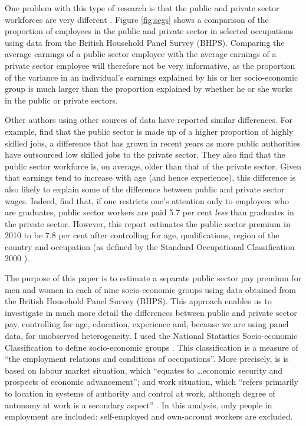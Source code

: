 \documentclass[a4paper,11pt,titlepage]{article}
\begin{document}
 One problem with this type of research is that the public and private sector workforces are very different \citep{IDS2011}.  Figure \ref{fig:segs} shows a comparison of the proportion of employees in the public and private sector in selected occupations using data from the British Household Panel Survey (BHPS).  Comparing the average earnings of a public sector employee with the average earnings of a private sector employee will therefore not be very informative, as the proportion of the variance in an individual's earnings explained by his or her socio-economic group is much larger than the proportion explained by whether he or she works in the public or private sectors.

 Other authors using other sources of data have reported similar differences.  For example, \citet{Damant2011}
 find that the public sector is made up of a higher proportion of highly skilled jobs, a difference that has grown in recent years as more public authorities have outsourced low skilled jobs to the private sector.  They also find that the public sector workforce is, on average, older than that of the private sector.  Given that earnings tend to increase with age (and hence experience), this difference is also likely to explain some of the difference between public and private sector wages.  Indeed, \citet{Damant2011} find that, if one restricts one's attention only to employees who are graduates, public sector workers are paid 5.7 per cent \emph{less} than graduates in the private sector.  However, this report estimates the public sector premium in 2010 to be 7.8 per cent after controlling for age, qualifications, region of the country and occupation (as defined by the Standard Occupational Classification 2000 \citep{SOC2000}).

 The purpose of this paper is to estimate a separate public sector pay premium for men and women in each of nine socio-economic groups using data obtained from the British Household Panel Survey (BHPS).  This approach enables us to investigate in much more detail the differences between public and private sector pay, controlling for age, education, experience and, because we are using panel data, for unobserved heterogeneity. I used the National Statistics Socio-economic Classification to define socio-economic groups \citep{ONSSEC}.  This classification is a measure of ``the employment relations and conditions of occupations''. More precisely, is is based on labour market situation, which ``equates to \dots economic security and prospects of economic advancement''; and  work situation, which ``refers primarily to location in systems of authority and control at work, although degree of autonomy at work is a secondary aspect'' \citep{ONSSEC}. In this analysis, only people in employment are included: self-employed and own-account workers are excluded.
\end{document}
